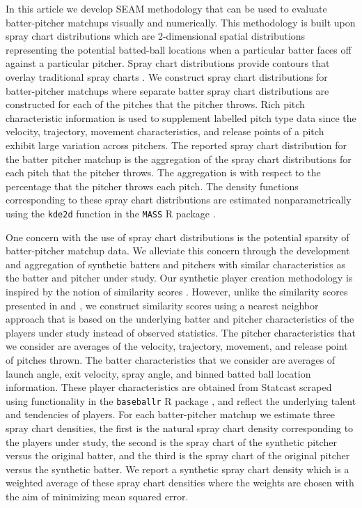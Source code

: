 \documentclass[12pt]{article}
\begin{document}
In this article we develop SEAM methodology that can be used to evaluate batter-pitcher matchups visually and numerically. This methodology is built upon spray chart distributions which are 2-dimensional spatial distributions representing the potential batted-ball locations when a particular batter faces off against a particular pitcher. Spray chart distributions provide contours that overlay traditional spray charts \citep{pettispray, marchi2019analyzing}. We construct spray chart distributions for batter-pitcher matchups where separate batter spray chart distributions are constructed for each of the pitches that the pitcher throws. Rich pitch characteristic information is used to supplement labelled pitch type data since the velocity, trajectory, movement characteristics, and release points of a pitch exhibit large variation across pitchers. The reported spray chart distribution for the batter pitcher matchup is the aggregation of the spray chart distributions for each pitch that the pitcher throws. The aggregation is with respect to the percentage that the pitcher throws each pitch. The density functions corresponding to these spray chart distributions are estimated nonparametrically using the \texttt{kde2d} function in the \texttt{MASS} R package \citep{MASS}.

One concern with the use of spray chart distributions is the potential sparsity of batter-pitcher matchup data. We alleviate this concern through the development and aggregation of synthetic batters and pitchers with similar characteristics as the batter and pitcher under study. Our synthetic player creation methodology is inspired by the notion of similarity scores \citep{james1994politics, PECOTA}. However, unlike the similarity scores presented in \cite{james1994politics} and \cite{PECOTA}, we construct similarity scores using a nearest neighbor approach that is based on the underlying batter and pitcher characteristics of the players under study instead of observed statistics. The pitcher characteristics that we consider are averages of the velocity, trajectory, movement, and release point of pitches thrown. The batter characteristics that we consider are averages of launch angle, exit velocity, spray angle, and binned batted ball location information. These player characteristics are obtained from Statcast \citep{statcast} scraped using functionality in the \texttt{baseballr} R package \citep{baseballr}, and reflect the underlying talent and tendencies of players. For each batter-pitcher matchup we estimate three spray chart densities, the first is the natural spray chart density corresponding to the players under study, the second is the spray chart of the synthetic pitcher versus the original batter, and the third is the spray chart of the original pitcher versus the synthetic batter. We report a synthetic spray chart density which is a weighted average of these spray chart densities where the weights are chosen with the aim of minimizing mean squared error. 
\end{document}

